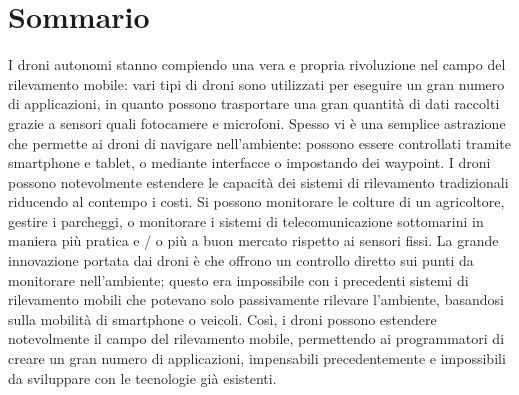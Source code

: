 \chapter*{Sommario}


I droni autonomi stanno compiendo una vera e propria rivoluzione nel campo del rilevamento mobile:
vari tipi di droni sono utilizzati per eseguire un gran numero di applicazioni, in quanto possono trasportare una gran quantità di dati raccolti grazie a sensori quali fotocamere e microfoni.
Spesso vi è una semplice astrazione che permette ai droni di navigare nell'ambiente: possono essere controllati tramite smartphone e tablet, o mediante interfacce o impostando dei waypoint.
I droni possono notevolmente estendere le capacità dei sistemi di rilevamento tradizionali riducendo al contempo i costi.
Si possono monitorare le colture di un agricoltore, gestire i parcheggi, o monitorare i sistemi di telecomunicazione sottomarini in maniera più pratica e / o più a buon mercato rispetto ai sensori fissi.
La grande innovazione portata dai droni è che offrono un controllo diretto sui punti da monitorare  nell'ambiente; questo era impossibile con i precedenti sistemi di rilevamento mobili che potevano solo passivamente rilevare l'ambiente, basandosi sulla mobilità di smartphone o veicoli.
Così, i droni possono estendere notevolmente il campo del rilevamento mobile, permettendo ai programmatori di creare un gran numero di applicazioni, impensabili precedentemente e impossibili da sviluppare con le tecnologie già esistenti.